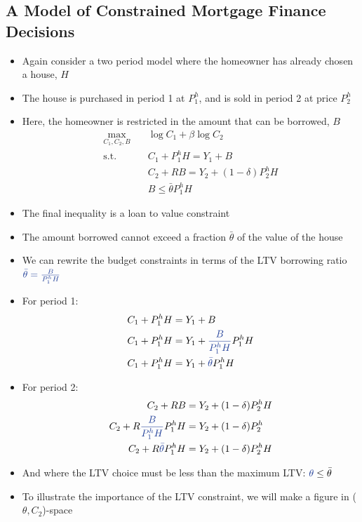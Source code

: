 \documentclass[a4paper,twoside]{article}
\newif\IfInSansMode
\numberwithin{equation}{section}
\numberwithin{figure}{section}
\begin{document}
\subsection{A Model of Constrained Mortgage Finance Decisions}
	\begin{itemize}
		\item Again consider a two period model where the homeowner has already chosen a house, \( H \)
		\item The house is purchased in period 1 at \( P_1^h \), and is sold in period 2 at price \( P_2^h \)
		\item Here, the homeowner is restricted in the amount that can be borrowed, \( B \)
		\begin{align*}
			\max_{C_1,C_2,B}\quad &\log C_1 + \beta\log C_2\\
			\text{s.t.}\quad &C_1+P_1^h H = Y_1 + B\\
			&C_2 + RB = Y_2 + (1-\delta) P_2^h H\\
			&B \leq \bar{\theta}P_1^h H
		\end{align*}
		\item The final inequality is a \textcolor{myblue}{loan to value constraint}
		\item The amount borrowed cannot exceed a fraction \( \bar{\theta} \) of the value of the house
		\item We can rewrite the budget constraints in terms of the LTV borrowing ratio \( \textcolor{myblue}{\bar{\theta} =\frac{B}{P_1^h H}} \)
		\item For period 1:
		\begin{align*}
			C_1+P_1^h H &= Y_1 + B\\
			C_1+P_1^h H &= Y_1 + \textcolor{myblue}{\frac{B}{P_1^h H}} P_1^h H\\
			C_1+P_1^h H &= Y_1 + \textcolor{myblue}{\bar{\theta}} P_1^h H
		\end{align*}
		\item For period 2:
		\begin{align*}
			C_2 + RB &= Y_2 + (1-\delta) P_2^h H\\
			C_2 + R\textcolor{myblue}{\frac{B}{P_1^h H}} P_1^h H &= Y_2 + (1-\delta) P_2^h \\
			C_2 + R\textcolor{myblue}{\bar{\theta}} P_1^h H &= Y_2 + (1-\delta) P_2^h H
		\end{align*}
		\item And where the LTV choice must be less than the maximum LTV: \( \textcolor{myblue}{\theta} \leq \bar{\theta} \)
		\item To illustrate the importance of the LTV constraint, we will make a figure in (\( \theta,C_2 \))-space

\end{itemize}
\end{document}
